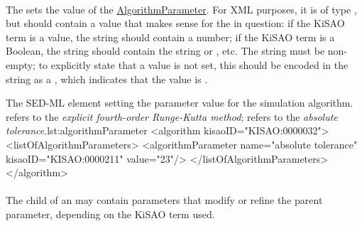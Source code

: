 \paragraph*{}
\label{sec:algorithmParameterValue}
The  sets the value of the \hyperref[class:algorithmParameter]{AlgorithmParameter}.  For XML purposes, it is of type , but should contain a value that makes sense for the  in question:  if the KiSAO term is a value, the string should contain a number; if the KiSAO term is a Boolean, the string should contain the string  or , etc.  The string must be non-empty; to explicitly state that a value is not set, this should be encoded in the string as a , which indicates that the value is .

\begin{myXmlLst}{The SED-ML  element setting the parameter value for the simulation algorithm.  refers to the \emph{explicit fourth-order Runge-Kutta method};  refers to the \emph{absolute tolerance}.}{lst:algorithmParameter}
<algorithm kisaoID="KISAO:0000032"> 
	<listOfAlgorithmParameters> 
		<algorithmParameter name="absolute tolerance" kisaoID="KISAO:0000211" value="23"/> 
	</listOfAlgorithmParameters>
</algorithm>
\end{myXmlLst}

\paragraph*{}
The child  of an \AlgorithmParameter may contain parameters that modify or refine the parent parameter, depending on the KiSAO term used.  

